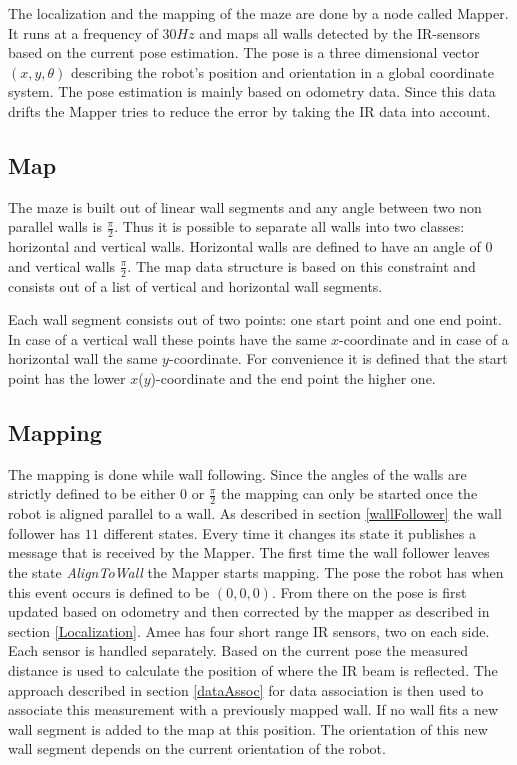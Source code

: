 The localization and the mapping of the maze are done by a node called Mapper.
It runs at a frequency of $30Hz$ and maps all walls detected by the IR-sensors based on the current pose estimation. The pose is a three dimensional vector $(x,y,\theta)$ describing the robot's position and orientation in a global coordinate system. The pose estimation is mainly based on odometry data. Since this data drifts the Mapper tries to reduce the error by taking the IR data into account.


\subsection{Map}
The maze is built out of linear wall segments and any angle between two non parallel walls is $\frac{\pi}{2}$.
Thus it is possible to separate all walls into two classes: horizontal and vertical walls. Horizontal walls are defined to have an angle of $0$ and vertical walls $\frac{\pi}{2}$. 
The map data structure is based on this constraint and consists out of a list of vertical and horizontal wall segments.

Each wall segment consists out of two points: one start point and one end point. In case of a vertical wall these points have the same $x$-coordinate and in case of a horizontal wall the same $y$-coordinate. For convenience it is defined that the start point has the lower $x$($y$)-coordinate and the end point the higher one.

\subsection{Mapping}
The mapping is done while wall following. Since the angles of the walls are strictly defined to be either $0$ or $\frac{\pi}{2}$ the mapping can only be started once the robot is aligned parallel to a wall. As described in section \ref{wallFollower} the wall follower has $11$ different states. Every time it changes its state it publishes a message that is received by the Mapper. The first time the wall follower leaves the state \textit{AlignToWall} the Mapper starts mapping. The pose the robot has when this event occurs is defined to be $(0,0,0)$. From there on the pose is first updated based on odometry and then corrected by the mapper as described in section \ref{Localization}.
Amee has four short range IR sensors, two on each side. Each sensor is handled separately. Based on the current pose the measured distance is used to calculate the position of where the IR beam is reflected. The approach described in section \ref{dataAssoc} for data association is then used to associate this measurement with a previously mapped wall. If no wall fits a new wall segment is added to the map at this position. The orientation of this new wall segment depends on the current orientation of the robot.

